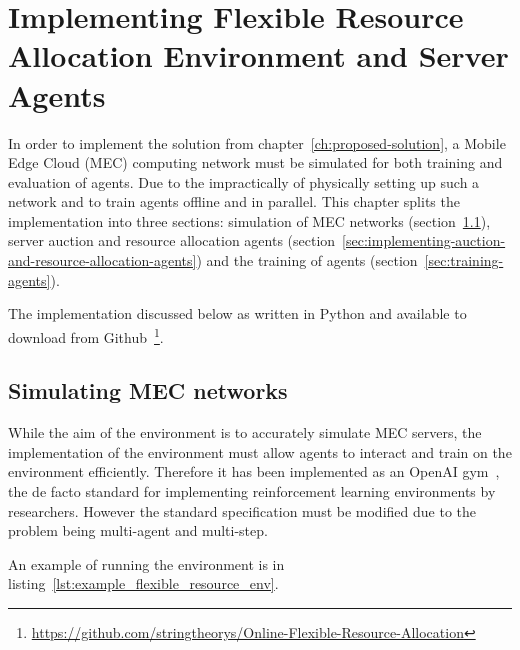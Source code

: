 

\chapter{Implementing Flexible Resource Allocation Environment and Server Agents}\label{ch:implementing-flexible-resource-allocation-environment-and-server-agents}
In order to implement the solution from chapter~\ref{ch:proposed-solution}, a Mobile Edge Cloud (MEC) computing network
must be simulated for both training and evaluation of agents. Due to the impractically of physically setting up
such a network and to train agents offline and in parallel. This chapter splits the implementation into three sections:
simulation of MEC networks (section~\ref{sec:simulating-mec-networks}), server auction and resource
allocation agents (section~\ref{sec:implementing-auction-and-resource-allocation-agents}) and the training of agents
(section~\ref{sec:training-agents}).

The implementation discussed below as written in Python and available to download from
Github~\footnote{\url{https://github.com/stringtheorys/Online-Flexible-Resource-Allocation}}.

\section{Simulating MEC networks}\label{sec:simulating-mec-networks}
While the aim of the environment is to accurately simulate MEC servers, the implementation of the environment must
allow agents to interact and train on the environment efficiently. Therefore it has been implemented
as an OpenAI gym~\citep{openaigym}, the de facto standard for implementing reinforcement learning environments by
researchers. However the standard specification must be modified due to the problem being multi-agent and multi-step.

An example of running the environment is in listing~\ref{lst:example_flexible_resource_env}.

